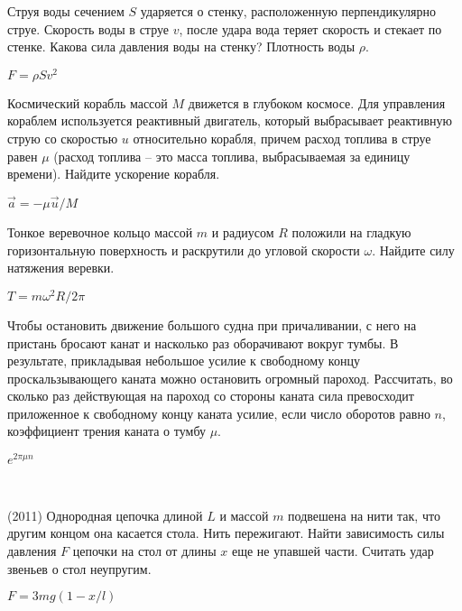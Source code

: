 \begin{ex}
Струя воды сечением $S$ ударяется о стенку, расположенную перпендикулярно струе. Скорость воды в струе $v$, после удара вода теряет скорость и стекает по стенке. Какова сила давления воды на стенку? Плотность воды $\rho$.
\begin{ans}
$F = \rho S v^2$
\end{ans}
\end{ex}

\begin{ex}
Космический корабль массой $M$ движется в глубоком космосе. Для управления кораблем используется реактивный двигатель, который выбрасывает реактивную струю со скоростью $u$ относительно корабля, причем расход топлива в струе равен $\mu$ (расход топлива -- это масса топлива, выбрасываемая за единицу времени). Найдите ускорение корабля.
\begin{ans}
$\vec a = - \mu \vec u / M$
\end{ans}
\end{ex}

\begin{ex}
Тонкое веревочное кольцо массой $m$ и радиусом $R$ положили на гладкую горизонтальную поверхность и раскрутили до угловой скорости $\omega$. Найдите силу натяжения веревки.
\begin{ans}
$T = m\omega^2R/2 \pi$
\end{ans}
\end{ex}

\begin{ex}
Чтобы остановить движение большого судна при причаливании, с него на пристань бросают канат и насколько раз оборачивают вокруг тумбы. В результате, прикладывая небольшое усилие к свободному концу проскальзывающего каната можно остановить огромный пароход. Рассчитать, во сколько раз действующая на пароход со стороны каната сила превосходит приложенное к свободному концу каната усилие, если число оборотов равно $n$, коэффициент трения каната о тумбу $\mu$.
\begin{ans}
$e^{2\pi \mu n}$
\end{ans}
\end{ex}

\begin{ex}
\hspace{0pt} \\
\begin{minipage}{.65\textwidth}
(2011) Однородная цепочка длиной $L$ и массой $m$ подвешена на нити так, что другим концом она касается стола. Нить пережигают. Найти зависимость силы давления $F$ цепочки на стол от длины $x$ еще не упавшей части. Считать удар звеньев о стол неупругим.
\end{minipage}
\begin{minipage}{.35\textwidth}
\centering

\end{minipage}
\begin{ans}
$F = 3mg(1-x/l)$
\end{ans}
\end{ex}

